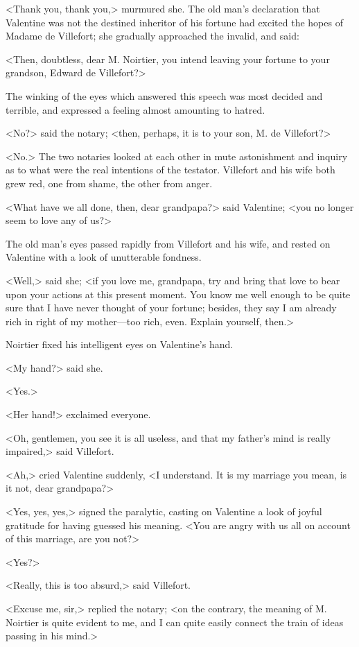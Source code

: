  <Thank you, thank you,> murmured she. The old man's declaration that Valentine was not the destined inheritor of his fortune had excited the hopes of Madame de Villefort; she gradually approached the invalid, and said: 

 <Then, doubtless, dear M. Noirtier, you intend leaving your fortune to your grandson, Edward de Villefort?> 

 The winking of the eyes which answered this speech was most decided and terrible, and expressed a feeling almost amounting to hatred. 

 <No?> said the notary; <then, perhaps, it is to your son, M. de Villefort?> 

 <No.> The two notaries looked at each other in mute astonishment and inquiry as to what were the real intentions of the testator. Villefort and his wife both grew red, one from shame, the other from anger. 

 <What have we all done, then, dear grandpapa?> said Valentine; <you no longer seem to love any of us?> 

 The old man's eyes passed rapidly from Villefort and his wife, and rested on Valentine with a look of unutterable fondness. 

 <Well,> said she; <if you love me, grandpapa, try and bring that love to bear upon your actions at this present moment. You know me well enough to be quite sure that I have never thought of your fortune; besides, they say I am already rich in right of my mother—too rich, even. Explain yourself, then.> 

 Noirtier fixed his intelligent eyes on Valentine's hand. 

 <My hand?> said she. 

 <Yes.> 

 <Her hand!> exclaimed everyone. 

 <Oh, gentlemen, you see it is all useless, and that my father's mind is really impaired,> said Villefort. 

 <Ah,> cried Valentine suddenly, <I understand. It is my marriage you mean, is it not, dear grandpapa?> 

 <Yes, yes, yes,> signed the paralytic, casting on Valentine a look of joyful gratitude for having guessed his meaning.  <You are angry with us all on account of this marriage, are you not?> 

 <Yes?> 

 <Really, this is too absurd,> said Villefort. 

 <Excuse me, sir,> replied the notary; <on the contrary, the meaning of M. Noirtier is quite evident to me, and I can quite easily connect the train of ideas passing in his mind.> 

